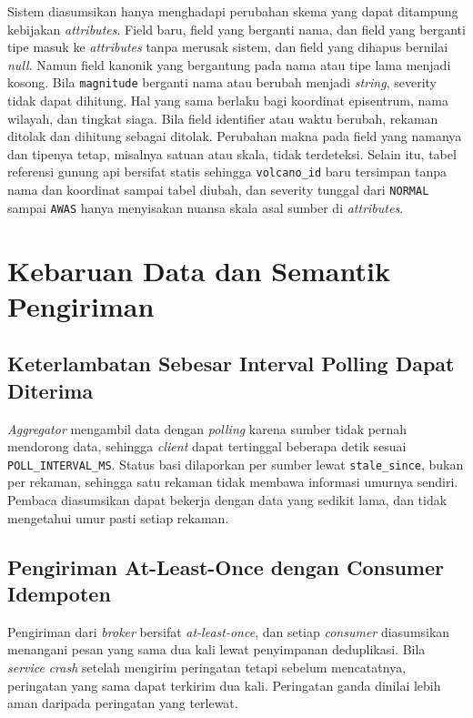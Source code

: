 Sistem diasumsikan hanya menghadapi perubahan skema yang dapat ditampung kebijakan \textit{attributes}. Field baru, field yang berganti nama, dan field yang berganti tipe masuk ke \textit{attributes} tanpa merusak sistem, dan field yang dihapus bernilai \textit{null}. Namun field kanonik yang bergantung pada nama atau tipe lama menjadi kosong. Bila \texttt{magnitude} berganti nama atau berubah menjadi \textit{string}, severity tidak dapat dihitung. Hal yang sama berlaku bagi koordinat episentrum, nama wilayah, dan tingkat siaga. Bila field identifier atau waktu berubah, rekaman ditolak dan dihitung sebagai ditolak. Perubahan makna pada field yang namanya dan tipenya tetap, misalnya satuan atau skala, tidak terdeteksi. Selain itu, tabel referensi gunung api bersifat statis sehingga \texttt{volcano\_id} baru tersimpan tanpa nama dan koordinat sampai tabel diubah, dan severity tunggal dari \texttt{NORMAL} sampai \texttt{AWAS} hanya menyisakan nuansa skala asal sumber di \textit{attributes}.

\section{Kebaruan Data dan Semantik Pengiriman}

\subsection{Keterlambatan Sebesar Interval Polling Dapat Diterima}

\textit{Aggregator} mengambil data dengan \textit{polling} karena sumber tidak pernah mendorong data, sehingga \textit{client} dapat tertinggal beberapa detik sesuai \texttt{POLL\_INTERVAL\_MS}. Status basi dilaporkan per sumber lewat \texttt{stale\_since}, bukan per rekaman, sehingga satu rekaman tidak membawa informasi umurnya sendiri. Pembaca diasumsikan dapat bekerja dengan data yang sedikit lama, dan tidak mengetahui umur pasti setiap rekaman.

\subsection{Pengiriman At-Least-Once dengan Consumer Idempoten}

Pengiriman dari \textit{broker} bersifat \textit{at-least-once}, dan setiap \textit{consumer} diasumsikan menangani pesan yang sama dua kali lewat penyimpanan deduplikasi. Bila \textit{service} \textit{crash} setelah mengirim peringatan tetapi sebelum mencatatnya, peringatan yang sama dapat terkirim dua kali. Peringatan ganda dinilai lebih aman daripada peringatan yang terlewat.

